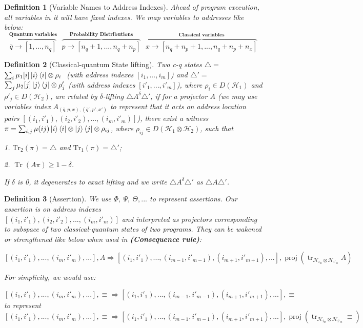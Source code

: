 \documentclass{report}
\newtheorem{definition}{Definition}[section]
\theoremstyle{defn_style}
\begin{document}
\begin{definition}[Variable Names to Address Indexes]
    Ahead of program execution, all variables in it will have fixed indexes. We map variables to addresses like below:
    \[\overset{\textbf{Quantum variables}}{\overbrace{ \bar{q}\rightarrow[1,...,n_q]}}~~~\overset{\textbf{Probability Distributions}}{\overbrace{ p\rightarrow[n_q+1,...,n_q+n_p]}}~~~\overset{\textbf{Classical variables}}{\overbrace{ x\rightarrow[n_q+n_p+1,...,n_q+n_p+n_x]}}\]
\end{definition}

\begin{definition}[Classical-quantum State lifting]
Two c-q states $\triangle =$ $\sum_i \mu_1[i]\ket{i}\bra{i}\otimes \rho_i\ $ (with address indexes $[i_1,...,i_m]$) and $\triangle'=$ $ \sum_j \mu_2[j]\ket{j}\bra{j}\otimes \rho'_j$ (with address indexes $[i'_1,...,i'_m]$), where $\rho_i\in D(\mathcal{H}_1)$ and $\rho'_j\in D(\mathcal{H}_2)$, are related by $\delta$-lifting $\triangle A^{\delta}\triangle'$, if for a projector $A$ (we may use variables index $A_{(\bar{q},p,x),(\bar{q}',p',x')}$ to represent that it acts on address location pairs $[(i_1,i'_1),(i_2,i'_2),...,(i_m,i'_m)]$), there exist a witness $\pi=\sum_{i,j}\mu(ij)\ket{i}\bra{i}\otimes\ket{j}\bra{j}\otimes \rho_{{ij}}$, where $\rho_{{ij}}\in D(\mathcal{H}_1\otimes\mathcal{H}_2)$, such that

1. $\text{Tr}_2\left(\pi\right)=\triangle$ and $\text{Tr}_1\left(\pi\right)=\triangle'$;

2. $\operatorname{Tr}(A \pi)\geq 1-\delta$.

If $\delta$ is 0, it degenerates to exact lifting and we write $\triangle A^{\delta}\triangle'$ as $\triangle A\triangle'
$.

\end{definition}

\begin{definition}[Assertion]
    We use $\Phi,~\Psi,~\Theta,...$ to represent assertions. Our assertion is on address indexes \\$[(i_1,i'_1),(i_2,i'_2),...,(i_m,i'_m)]$ and interpreted as projectors corresponding to subspace of two classical-quantum states of two programs. They can be wakened or strengthened like below when used in \textbf{(Consequence rule)}:

 \[[(i_1,i'_1),...,(i_m,i'_m),...],A\Longrightarrow[(i_1,i'_1),...,(i_{m-1},i'_{m-1}),(i_{m+1},i'_{m+1}),...],\operatorname{proj}(\operatorname{tr}_{\mathcal{H}_{i_m} \otimes \mathcal{H}_{i'_m}}A)\]

For simplicity, we would use:

 \[[(i_1,i'_1),...,(i_m,i'_m),...],\equiv\Longrightarrow[(i_1,i'_1),...,(i_{m-1},i'_{m-1}),(i_{m+1},i'_{m+1}),...],\equiv\] to represent\\ \[[(i_1,i'_1),...,(i_m,i'_m),...],\equiv\Longrightarrow[(i_1,i'_1),...,(i_{m-1},i'_{m-1}),(i_{m+1},i'_{m+1}),...],\operatorname{proj}(\operatorname{tr}_{\mathcal{H}_{i_m} \otimes \mathcal{H}_{i'_m}}\equiv)\]

\end{definition}
\end{document}
